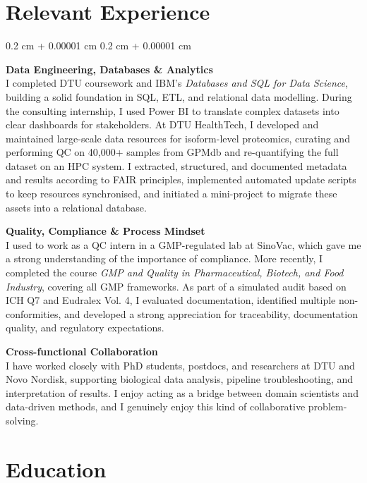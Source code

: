 \documentclass[10pt, letterpaper]{article}
\newenvironment{onecolentry}{
    \begin{adjustwidth}{
        0.2 cm + 0.00001 cm
    }{
        0.2 cm + 0.00001 cm
    }
}{
    \end{adjustwidth}
} %
\begin{document}
\section{Relevant Experience}

\begin{onecolentry}

\textbf{Data Engineering, Databases \& Analytics} \\
I completed DTU coursework and IBM’s \textit{Databases and SQL for Data Science}, building a solid foundation in SQL, ETL, and relational data modelling. During the consulting internship, I used Power BI to translate complex datasets into clear dashboards for stakeholders. At DTU HealthTech, I developed and maintained large-scale data resources for isoform-level proteomics, curating and performing QC on 40,000+ samples from GPMdb and re-quantifying the full dataset on an HPC system. I extracted, structured, and documented metadata and results according to FAIR principles, implemented automated update scripts to keep resources synchronised, and initiated a mini-project to migrate these assets into a relational database.

\vspace{0.3 cm}

\textbf{Quality, Compliance \& Process Mindset} \\
I used to work as a QC intern in a GMP-regulated lab at SinoVac, which gave me a strong understanding of the importance of compliance. More recently, I completed the course \textit{GMP and Quality in Pharmaceutical, Biotech, and Food Industry}, covering all GMP frameworks. As part of a simulated audit based on ICH Q7 and Eudralex Vol. 4, I evaluated documentation, identified multiple non-conformities, and developed a strong appreciation for traceability, documentation quality, and regulatory expectations.

\vspace{0.3 cm}

\textbf{Cross-functional Collaboration} \\
I have worked closely with PhD students, postdocs, and researchers at DTU and Novo Nordisk, supporting biological data analysis, pipeline troubleshooting, and interpretation of results. I enjoy acting as a bridge between domain scientists and data-driven methods, and I genuinely enjoy this kind of collaborative problem-solving. 

\end{onecolentry}
    \section{Education}
\end{document}

